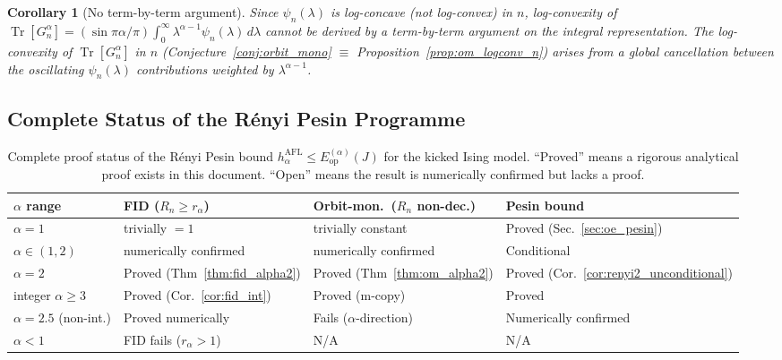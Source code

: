 \documentclass[12pt,a4paper]{article}
\newtheorem{corollary}[theorem]{Corollary}
\begin{document}
\begin{corollary}[No term-by-term argument]
Since $\psi_n(\lambda)$ is log-concave (not log-convex) in $n$, log-convexity of
$\operatorname{Tr}[G_n^\alpha]=(\sin\pi\alpha/\pi)\int_0^\infty\lambda^{\alpha-1}\psi_n(\lambda)\,d\lambda$
cannot be derived by a term-by-term argument on the integral representation.
The log-convexity of $\operatorname{Tr}[G_n^\alpha]$ in $n$ (Conjecture~\ref{conj:orbit_mono}
$\equiv$ Proposition~\ref{prop:om_logconv_n}) arises from a global cancellation
between the oscillating $\psi_n(\lambda)$ contributions weighted by $\lambda^{\alpha-1}$.
\end{corollary}

\subsection{Complete Status of the Rényi Pesin Programme}
\label{sec:renyi_pesin_status}

\begin{table}[h!]
\centering
\caption{Complete proof status of the Rényi Pesin bound
$h_\alpha^{\mathrm{AFL}}\leq E_{\mathrm{op}}^{(\alpha)}(J)$ for the kicked Ising model.
``Proved'' means a rigorous analytical proof exists in this document.
``Open'' means the result is numerically confirmed but lacks a proof.}
\label{tab:pesin_status}
\begin{tabular}{l|l|l|l}
$\alpha$ range & FID ($R_n\geq r_\alpha$) & Orbit-mon.\ ($R_n$ non-dec.) & Pesin bound \\
\hline
$\alpha=1$ & trivially $=1$ & trivially constant & Proved (Sec.~\ref{sec:oe_pesin}) \\
$\alpha\in(1,2)$ & numerically confirmed & numerically confirmed & Conditional \\
$\alpha=2$ & Proved (Thm~\ref{thm:fid_alpha2}) & Proved (Thm~\ref{thm:om_alpha2}) & Proved (Cor.~\ref{cor:renyi2_unconditional}) \\
integer $\alpha\geq 3$ & Proved (Cor.~\ref{cor:fid_int}) & Proved (m-copy) & Proved \\
$\alpha=2.5$ (non-int.) & Proved numerically & Fails ($\alpha$-direction) & Numerically confirmed \\
$\alpha<1$ & FID fails ($r_\alpha>1$) & N/A & N/A \\
\end{tabular}
\end{table}
\end{document}
